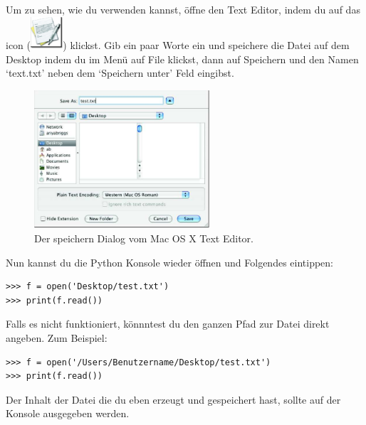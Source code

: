 \begin{MAC}
Um zu sehen, wie du  verwenden kannst, öffne den Text Editor, indem du auf das icon (\includegraphics*[width=12mm]{images/textedit-icon}) klickst. Gib ein paar Worte ein und speichere die Datei auf dem Desktop indem du im Menü auf File klickst, dann auf Speichern und den Namen `text.txt'  neben dem `Speichern unter' Feld eingibst.

\begin{figure}
\begin{center}
\includegraphics[width=65mm]{images/figure18}
\end{center}
\caption{Der speichern Dialog vom Mac OS X Text Editor.}\label{fig18}
\end{figure}

Nun kannst du die Python Konsole wieder öffnen und Folgendes eintippen:

\begin{Verbatim}[frame=single]
>>> f = open('Desktop/test.txt')
>>> print(f.read())
\end{Verbatim}

Falls es nicht funktioniert, könnntest du den ganzen Pfad zur Datei direkt angeben. Zum Beispiel:

\begin{Verbatim}[frame=single]
>>> f = open('/Users/Benutzername/Desktop/test.txt')
>>> print(f.read())
\end{Verbatim}

Der Inhalt der Datei die du eben erzeugt und gespeichert hast, sollte auf der Konsole ausgegeben werden. %
\end{MAC}

